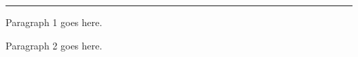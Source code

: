 \documentclass{book}
\begin{document}
%
%
%
%

\hrule

\beginnumbering
\numberpstarttrue

\pstart
Paragraph 1 goes here.
\pend

\pstart
Paragraph 2 goes here.
\pend

\endnumbering
\end{document}
